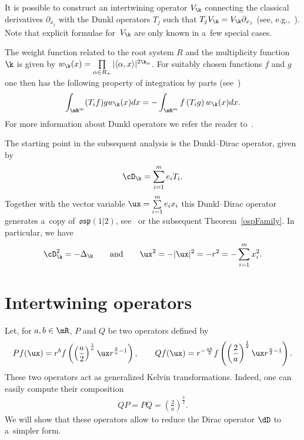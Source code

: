 It is possible to construct an intertwining operator $V_{\k}$ connecting the classical derivatives
$\partial_{x_{j}}$ with the Dunkl operators $T_{j}$ such that $T_{j}V_{\k}=V_{\k}
\partial_{x_{j}}$ (see, e.g.,~\cite{MR1273532}).
Note that explicit formulae for~$V_{\k}$ are only known in a~few special cases.

The weight function related to the root system $R$ and the multiplicity function $\k$ is given by
$w_{\k}(x)=\prod\limits_{\alpha\in R_{+}}|\langle\alpha,x\rangle|^{2\k_{\alpha}}$.
For suitably chosen functions $f$ and $g$ one then has the following property of integration by
parts (see~\cite{Du4})
\begin{gather}
\int_{\mR^{m}}(T_{i}f)g w_{\k}(x)dx=-\int_{\mR^{m}}f\left(T_{i}g\right)w_{\k}(x)dx.
\label{skewnessDunkl}
\end{gather}
For more information about Dunkl operators we refer the reader to~\cite{MR1827871, MR2022853}.

The starting point in the subsequent analysis is the Dunkl--Dirac operator, given by
\begin{gather*}
\cD_{\k}=\sum_{i=1}^{m}e_{i}T_{i}.
\end{gather*}
Together with the vector variable $\ux=\sum\limits_{i=1}^{m}e_{i}x_{i}$ this Dunkl--Dirac operator
generates a~copy of~$\mathfrak{osp}(1|2)$, see~\cite{Orsted} or the subsequent Theorem~\ref{ospFamily}.
In particular, we have
\begin{gather*}
\cD_{\k}^{2}=-\Delta_{\k}\qquad\text{and}\qquad\ux^{2}=-|\ux|^{2}=-r^{2}=-
\sum_{i=1}^{m}x_{i}^{2}.
\end{gather*}

\section{Intertwining operators}\label{section3}

Let, for $a,b\in\mR$, $P$ and $Q$ be two operators def\/ined by
\begin{gather*}
P f(\ux)=r^{b}f\left(\left(\frac{a}{2}\right)^{\frac{1}{a}}\ux r^{\frac{2}{a}-1}\right),\qquad
Q f(\ux)=r^{-\frac{ab}{2}}f\left(\left(\frac{2}{a}\right)^{\frac{1}{2}}\ux r^{\frac{a}{2}-1}\right).
\end{gather*}
These two operators act as generalized Kelvin transformations.
Indeed, one can easily compute their composition
\begin{gather*}
Q P=P Q=\left(\frac{2}{a}\right)^{\frac{b}{2}}.
\end{gather*}
We will show that these operators allow to reduce the Dirac operator $\dD$ to a~simpler form.

